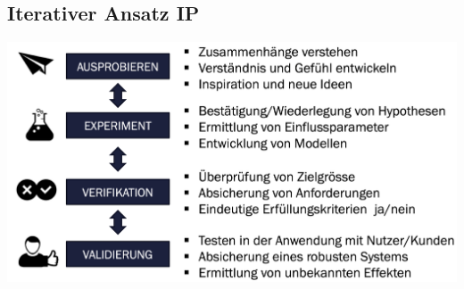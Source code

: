 \subsection{Iterativer Ansatz \hfill IP}
\begin{center}
    \includegraphics[width = 0.9\linewidth]{MAEIP_Testing}
\end{center}